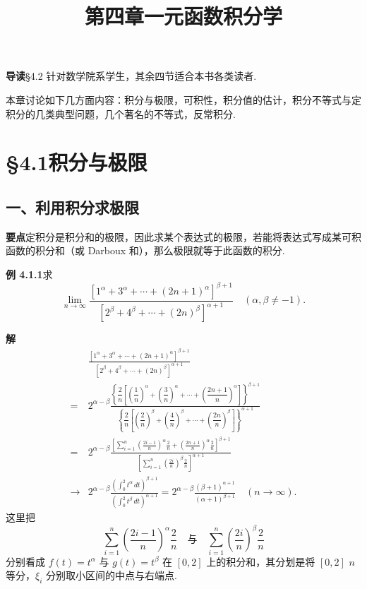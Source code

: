 \documentclass[UTF8,12pt,a4paper,fontset=fandol]{ctexart}
\title{第四章\quad 一元函数积分学}
\author{}
\date{}
\begin{document}
\maketitle

\noindent\textbf{导读}\quad §4.2 针对数学院系学生，其余四节适合本书各类读者.

本章讨论如下几方面内容：积分与极限，可积性，积分值的估计，积分不等式与定积分的几类典型问题，几个著名的不等式，反常积分.

\section*{§4.1\quad 积分与极限}

\subsection*{一、利用积分求极限}

\noindent\textbf{要点}\quad 定积分是积分和的极限，因此求某个表达式的极限，若能将表达式写成某可积函数的积分和（或 Darboux 和），那么极限就等于此函数的积分.

\noindent\textbf{例 4.1.1}\quad 求
\[
\lim_{n\to\infty}
\frac{\left[1^\alpha+3^\alpha+\cdots+(2n+1)^\alpha\right]^{\beta+1}}
{\left[2^\beta+4^\beta+\cdots+(2n)^\beta\right]^{\alpha+1}}
\quad(\alpha,\beta\ne-1).
\]

\noindent\textbf{解}\quad
\[
\begin{aligned}
&\frac{\left[1^\alpha+3^\alpha+\cdots+(2n+1)^\alpha\right]^{\beta+1}}
{\left[2^\beta+4^\beta+\cdots+(2n)^\beta\right]^{\alpha+1}}\\
={}&2^{\alpha-\beta}
\frac{\left\{\dfrac2n\left[\left(\dfrac1n\right)^\alpha+
\left(\dfrac3n\right)^\alpha+\cdots+
\left(\dfrac{2n+1}{n}\right)^\alpha\right]\right\}^{\beta+1}}
{\left\{\dfrac2n\left[\left(\dfrac2n\right)^\beta+
\left(\dfrac4n\right)^\beta+\cdots+
\left(\dfrac{2n}{n}\right)^\beta\right]\right\}^{\alpha+1}}\\
={}&2^{\alpha-\beta}
\frac{\left[\displaystyle\sum_{i=1}^n
\left(\frac{2i-1}{n}\right)^\alpha\frac2n+
\left(\frac{2n+1}{n}\right)^\alpha\frac2n\right]^{\beta+1}}
{\left[\displaystyle\sum_{i=1}^n
\left(\frac{2i}{n}\right)^\beta\frac2n\right]^{\alpha+1}}\\
\longrightarrow{}&2^{\alpha-\beta}
\frac{\left(\displaystyle\int_0^2 t^\alpha\,dt\right)^{\beta+1}}
{\left(\displaystyle\int_0^2 t^\beta\,dt\right)^{\alpha+1}}
=2^{\alpha-\beta}\frac{(\beta+1)^{\alpha+1}}{(\alpha+1)^{\beta+1}}
\quad(n\to\infty).
\end{aligned}
\]
这里把
\[
\sum_{i=1}^n\left(\frac{2i-1}{n}\right)^\alpha\frac2n
\quad\text{与}\quad
\sum_{i=1}^n\left(\frac{2i}{n}\right)^\beta\frac2n
\]
分别看成 $f(t)=t^\alpha$ 与 $g(t)=t^\beta$ 在 $[0,2]$ 上的积分和，其分划是将 $[0,2]$ $n$ 等分，$\xi_i$ 分别取小区间的中点与右端点.
\end{document}
